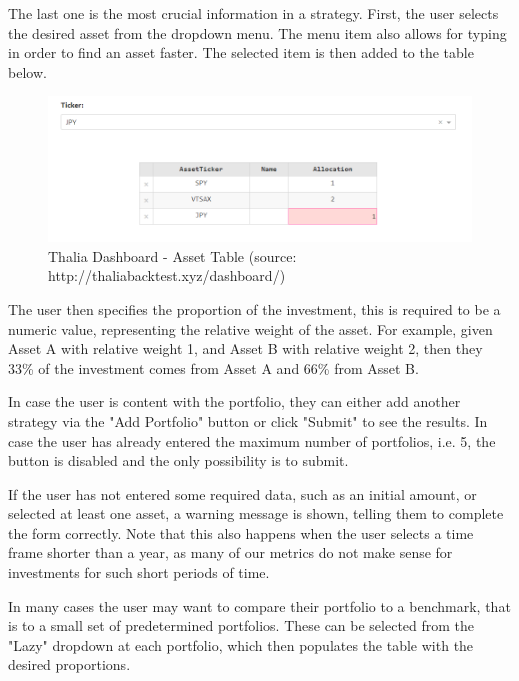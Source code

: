 \documentclass[main.tex]{subfiles}
\begin{document}
The last one is the most crucial information in a strategy. First, the user selects the desired asset from the dropdown menu. The menu item also allows for typing in order to find an asset faster. The selected item is then added to the table below.



\begin{figure}[H]

   \centering

   \includegraphics[width=\textwidth]{08Appendices/081User/081Pictures/table.png}

   \caption{Thalia Dashboard - Asset Table (source: http://thaliabacktest.xyz/dashboard/)}

   \label{thalia_table}

\end{figure}


The user then specifies the proportion of the investment, this is required to be a numeric value, representing the relative weight of the asset. For example, given Asset A with relative weight 1, and Asset B with relative weight 2, then they 33\% of the investment comes from Asset A and 66\% from Asset B.

In case the user is content with the portfolio, they can either add another strategy via the "Add Portfolio" button or click "Submit" to see the results. In case the user has already entered the maximum number of portfolios, i.e. 5, the button is disabled and the only possibility is to submit.

If the user has not entered some required data, such as an initial amount, or selected at least one asset, a warning message is shown, telling them to complete the form correctly. Note that this also happens when the user selects a time frame shorter than a year, as many of our metrics do not make sense for investments for such short periods of time.

In many cases the user may want to compare their portfolio to a benchmark, that is to a small set of predetermined portfolios. These can be selected from the "Lazy" dropdown at each portfolio, which then populates the table with the desired proportions.
\end{document}
